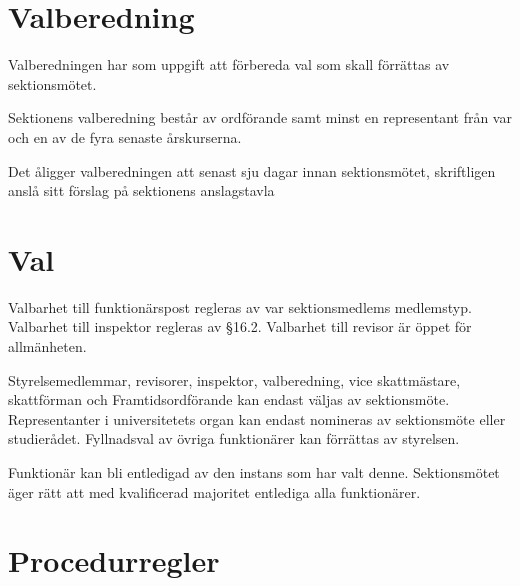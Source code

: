\documentclass[stadgar]{dsekprotokoll}
\begin{document}
\section{Valberedning}

\begin{stadgeavsnitt}


Valberedningen har som uppgift att förbereda val som skall förrättas av
sektionsmötet.


Sektionens valberedning består av ordförande samt minst en representant
från var och en av de fyra senaste årskurserna.


Det åligger valberedningen att senast sju dagar innan sektionsmötet, skriftligen anslå sitt förslag på sektionens anslagstavla

\end{stadgeavsnitt}

\section{Val}

\begin{stadgeavsnitt}


Valbarhet till funktionärspost regleras av var sektionsmedlems
medlemstyp. Valbarhet till inspektor regleras av \S16.2. Valbarhet till revisor är öppet för
allmänheten.


Styrelsemedlemmar, revisorer, inspektor, valberedning, vice skattmästare, skattförman och Framtidsordförande kan endast väljas av sektionsmöte. Representanter i universitetets organ kan endast nomineras av sektionsmöte eller studierådet. Fyllnadsval av övriga
funktionärer kan förrättas av styrelsen.




Funktionär kan bli entledigad av den instans som har valt denne. Sektionsmötet äger rätt
att med kvalificerad majoritet entlediga alla funktionärer.

\end{stadgeavsnitt}

\section{Procedurregler}
\end{document}
